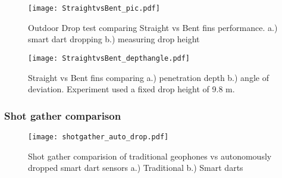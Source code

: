 \begin{figure} \centering
  {\texttt{[image: StraightvsBent\_pic.pdf]}}
 \caption{Outdoor Drop test comparing Straight vs Bent fins performance.
 a.)  smart dart dropping 
 b.)  measuring drop height} 
 \label{fig:StraightBentPic}
 \vspace{-1em}
\end{figure}
\begin{figure} \centering
  {\texttt{[image: StraightvsBent\_depthangle.pdf]}}
 \caption{\label{fig:StraightBentDepth}Straight vs Bent fins comparing a.) penetration depth b.) angle of deviation. Experiment used a fixed drop height of 9.8 m.} 
\end{figure}
\subsubsection{Shot gather comparison}

\begin{figure} \centering
  {\texttt{[image: shotgather\_auto\_drop.pdf]}}
 \caption{Shot gather comparision of traditional geophones vs autonomously dropped smart dart sensors a.) Traditional b.) Smart darts} 
 \label{fig:TradvsAutoDrop}
\end{figure}


 